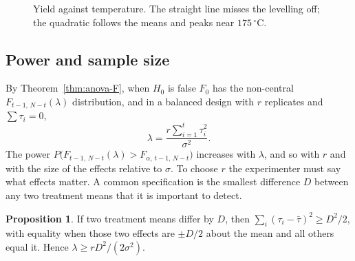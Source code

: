\documentclass[11pt,a4paper]{article}
\numberwithin{equation}{section}
\theoremstyle{definition}
\newtheorem{prop}[thm]{Proposition}
\begin{document}
\begin{figure}[H]
\centering
{}
\caption{Yield against temperature. The straight line misses the levelling off; the quadratic follows the means and peaks near $175\,^\circ$C.}
\label{fig:temperature}
\end{figure}

\subsection{Power and sample size}
By Theorem~\ref{thm:anova-F}, when $H_0$ is false $F_0$ has the non-central $F_{t-1,\,N-t}(\lambda)$ distribution, and in a balanced design with $r$ replicates and
$\sum\tau_i = 0$,
\[
\lambda = \frac{r\sum_{i=1}^t\tau_i^2}{\sigma^2} .
\]
The power $P\bigl(F_{t-1,\,N-t}(\lambda) > F_{\alpha,\,t-1,\,N-t}\bigr)$ increases with $\lambda$, and so with $r$ and with the size of the effects relative to $\sigma$. To choose $r$ the
experimenter must say what effects matter. A common specification is the smallest difference $D$ between any two treatment means that it is
important to detect.

\begin{prop}
If two treatment means differ by $D$, then $\sum_i(\tau_i - \bar\tau)^2 \ge D^2/2$, with equality when those two effects are $\pm D/2$ about the mean and all others
equal it. Hence $\lambda \ge rD^2/(2\sigma^2)$.
\end{prop}
\end{document}
